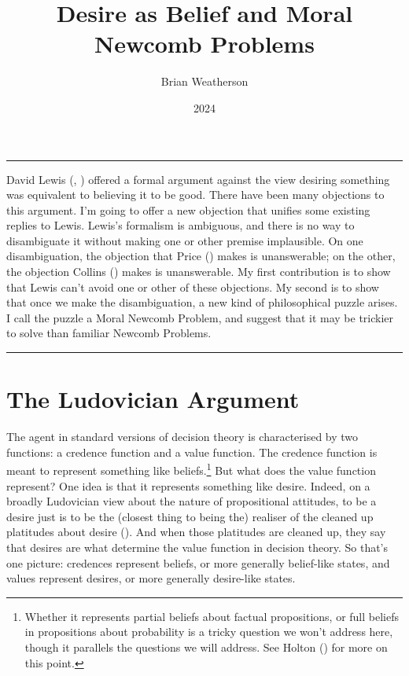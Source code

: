 \documentclass[
  10pt,
  letterpaper,
  DIV=11,
  numbers=noendperiod,
  twoside]{scrartcl}
\title{Desire as Belief and Moral Newcomb Problems}
\author{Brian Weatherson}
\date{2024}
\renewenvironment{abstract}
 {\vspace{-1.25cm}
 \quotation\small\noindent\rule{\linewidth}{.5pt}\par\smallskip
 \noindent }
 {\par\noindent\rule{\linewidth}{.5pt}\endquotation}
\begin{document}
\maketitle
\begin{abstract}
David Lewis (,
) offered a formal argument against the
view desiring something was equivalent to believing it to be good. There
have been many objections to this argument. I'm going to offer a new
objection that unifies some existing replies to Lewis. Lewis's formalism
is ambiguous, and there is no way to disambiguate it without making one
or other premise implausible. On one disambiguation, the objection that
Price () makes is unanswerable; on the
other, the objection Collins () makes is
unanswerable. My first contribution is to show that Lewis can't avoid
one or other of these objections. My second is to show that once we make
the disambiguation, a new kind of philosophical puzzle arises. I call
the puzzle a Moral Newcomb Problem, and suggest that it may be trickier
to solve than familiar Newcomb Problems.
\end{abstract}


\section{The Ludovician Argument}\label{the-ludovician-argument}

The agent in standard versions of decision theory is characterised by
two functions: a credence function and a value function. The credence
function is meant to represent something like beliefs.\footnote{Whether
  it represents partial beliefs about factual propositions, or full
  beliefs in propositions about probability is a tricky question we
  won't address here, though it parallels the questions we will address.
  See Holton () for more on this point.}
But what does the value function represent? One idea is that it
represents something like desire. Indeed, on a broadly Ludovician view
about the nature of propositional attitudes, to be a desire just is to
be the (closest thing to being the) realiser of the cleaned up
platitudes about desire (). And
when those platitudes are cleaned up, they say that desires are what
determine the value function in decision theory. So that's one picture:
credences represent beliefs, or more generally belief-like states, and
values represent desires, or more generally desire-like states.
\end{document}
